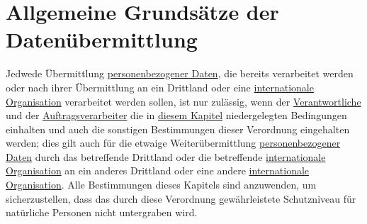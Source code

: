 \chapter{Allgemeine Grundsätze der Datenübermittlung}
\label{ch:44}


Jedwede Übermittlung \hyperref[itm:04-1]{personenbezogener Daten}, die bereits verarbeitet werden oder nach ihrer
Übermittlung an ein Drittland oder eine \hyperref[itm:04-29]{internationale Organisation} verarbeitet werden sollen,
ist nur zulässig, wenn der \hyperref[itm:04-7]{Verantwortliche} und der \hyperref[itm:04-8]{Auftragsverarbeiter} die
in \hyperref[part:5]{diesem Kapitel} niedergelegten Bedingungen einhalten und auch die sonstigen Bestimmungen dieser
Verordnung eingehalten werden; dies gilt auch für die etwaige Weiterübermittlung
\hyperref[itm:04-1]{personenbezogener Daten} durch das betreffende Drittland oder die betreffende \hyperref[itm:04-29]
 {internationale Organisation} an ein anderes Drittland oder eine andere \hyperref[itm:04-29]
 {internationale Organisation}. Alle Bestimmungen dieses Kapitels sind anzuwenden, um sicherzustellen, dass das durch
 diese Verordnung gewährleistete Schutzniveau für natürliche Personen nicht untergraben wird.


